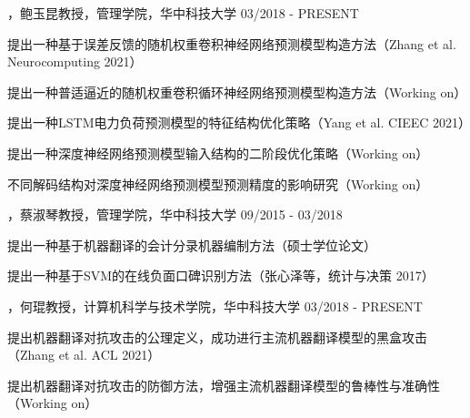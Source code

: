 
\begin{cventries}

\cvexperience
{，鲍玉昆教授，管理学院，华中科技大学}
{03/2018 - PRESENT}
{
    \begin{cvitems}
    \item {提出一种基于误差反馈的随机权重卷积神经网络预测模型构造方法（Zhang et al. Neurocomputing 2021）}
    \item {提出一种普适逼近的随机权重卷积循环神经网络预测模型构造方法（Working on）}
    \item {提出一种LSTM电力负荷预测模型的特征结构优化策略（Yang et al. CIEEC 2021）}
    \item {提出一种深度神经网络预测模型输入结构的二阶段优化策略（Working on）}
    \item {不同解码结构对深度神经网络预测模型预测精度的影响研究（Working on）}
    \end{cvitems}
}




\cvexperience
{，蔡淑琴教授，管理学院，华中科技大学}
{09/2015 - 03/2018}
{
    \begin{cvitems}
    \item {提出一种基于机器翻译的会计分录机器编制方法（硕士学位论文）}
    \item {提出一种基于SVM的在线负面口碑识别方法（张心泽等，统计与决策 2017）}
    \end{cvitems}
}

\cvexperience
{，何琨教授，计算机科学与技术学院，华中科技大学}
{03/2018 - PRESENT}
{
    \begin{cvitems}
    \item {提出机器翻译对抗攻击的公理定义，成功进行主流机器翻译模型的黑盒攻击（Zhang et al. ACL 2021）}
    \item {提出机器翻译对抗攻击的防御方法，增强主流机器翻译模型的鲁棒性与准确性（Working on）}
    \end{cvitems}
}


\end{cventries}